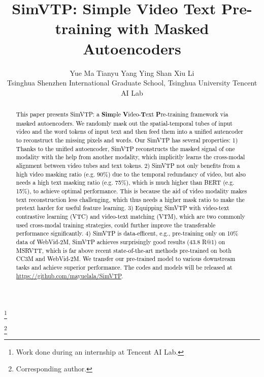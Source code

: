 \documentclass[10pt,twocolumn,letterpaper]{article}
\newcommand{\yty}[1]{\textcolor{black}{#1}}
\begin{document}
	
\title{SimVTP: Simple Video Text Pre-training with Masked Autoencoders}
	
\author{Yue Ma \quad
Tianyu Yang \quad
Ying Shan \quad
Xiu Li \\
Tsinghua Shenzhen International Graduate School, Tsinghua University \quad 
Tencent AI Lab
}
\maketitle


\newcommand\blfootnote[1]{\begingroup
  \renewcommand\thefootnote{}\footnote{#1}\addtocounter{footnote}{-1}\endgroup
}

\blfootnote{ Work done during an internship at Tencent AI Lab.}
\blfootnote{ Corresponding author.}

\begin{abstract}
	
	\yty{This paper presents SimVTP: a \textbf{Sim}ple \textbf{V}ideo-\textbf{T}ext \textbf{P}re-training framework via masked autoencoders. We randomly mask out the spatial-temporal tubes of input video and the word tokens of input text and then feed them into a unified autencoder to reconstruct the missing pixels and words.  Our SimVTP has several properties: 1) Thanks to the unified autoencoder,  SimVTP reconstructs the masked signal of one modality with the help from another modality, which implicitly learns the cross-modal alignment between video tubes and text tokens. 2) SimVTP not only benefits from a high video masking ratio (e.g. 90\%) due to the temporal redundancy of video, but also needs a high text masking ratio (e.g. 75\%), which is much higher than BERT (e.g. 15\%), to achieve optimal performance.  This is because the aid of video modality makes text reconstruction less challenging, which thus needs a higher mask ratio to make the pretext harder for useful feature learning. 3) Equipping SimVTP with video-text contrastive learning (VTC) and video-text matching (VTM), which are two commonly used cross-modal training strategies, could further improve the transferable performance significantly. 4) SimVTP is data-efficent, e.g., pre-training only on 10\% data of WebVid-2M, SimVTP achieves surprisingly good results (43.8 R@1) on MSRVTT, which is far above recent state-of-the-art methods pre-trained on both CC3M and WebVid-2M.  We transfer our pre-trained model to various downstream tasks and achieve superior performance. The codes and models will be released at \href{https://github.com/mayuelala/SimVTP}{https://github.com/mayuelala/SimVTP}.
 }
	
\end{abstract}
\end{document}
